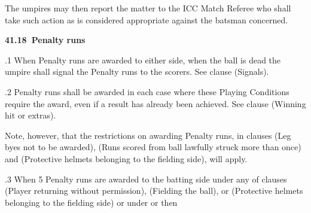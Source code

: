 \documentclass[12pt]{article}
\begin{document}
\vspace{\baselineskip}
\begin{adjustwidth}{0.5in}{0.57in}
{\fontsize{9pt}{10.8pt}\selectfont The umpires may then report the matter to the ICC Match Referee who shall take such action as is considered appropriate against the batsman concerned.\par}\par

\end{adjustwidth}


\vspace{\baselineskip}
{\fontsize{11pt}{13.2pt}\selectfont \textbf{41.18\  Penalty runs}\par}\par


\vspace{\baselineskip}
\begin{adjustwidth}{0.5in}{0.0in}
{\fontsize{9pt}{10.8pt}.1 When Penalty runs are awarded to either side, when the ball is dead the umpire shall signal the Penalty runs to the scorers. See clause (Signals).\par}\par

\end{adjustwidth}


\vspace{\baselineskip}
\begin{adjustwidth}{0.5in}{0.25in}
{\fontsize{9pt}{10.8pt}.2 Penalty runs shall be awarded in each case where these Playing Conditions require the award, even if a result has already been achieved. See clause (Winning hit or extras).\par}\par

\end{adjustwidth}


\vspace{\baselineskip}
\begin{adjustwidth}{0.5in}{0.03in}
{\fontsize{9pt}{10.8pt}\selectfont Note, however, that the restrictions on awarding Penalty runs, in clauses (Leg byes not to be awarded), (Runs scored from ball lawfully struck more than once) and (Protective helmets belonging to the fielding side), will apply.\par}\par

\end{adjustwidth}


\vspace{\baselineskip}
\begin{adjustwidth}{0.5in}{0.01in}
{\fontsize{9pt}{10.8pt}.3 When 5 Penalty runs are awarded to the batting side under any of clauses (Player returning without permission), (Fielding the ball), or (Protective helmets belonging to the fielding side) or under  or then\par}\par

\end{adjustwidth}
\end{document}
